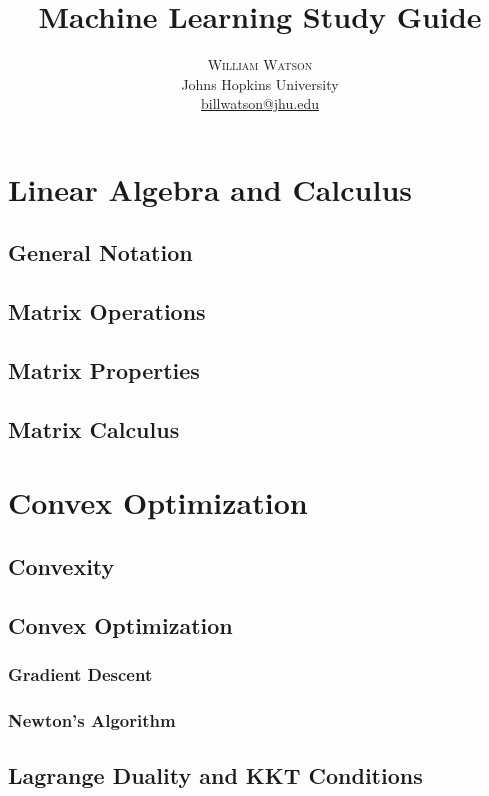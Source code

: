 \documentclass[twoside,twocolumn]{article}
\title{Machine Learning Study Guide}
\author{%
  \textsc{William Watson} \\[1ex]
  \normalsize Johns Hopkins University \\
  \normalsize \href{mailto:billwatson@jhu.edu}{billwatson@jhu.edu}
}
\date{}%
\begin{document}
\maketitle


\onecolumn
\section{Linear Algebra and Calculus}
\subsection{General Notation}
\subsection{Matrix Operations}
\subsection{Matrix Properties}
\subsection{Matrix Calculus}
\section{Convex Optimization}
\subsection{Convexity}
\subsection{Convex Optimization}
\subsubsection{Gradient Descent}
\subsubsection{Newton's Algorithm}
\subsection{Lagrange Duality and KKT Conditions}
\end{document}

